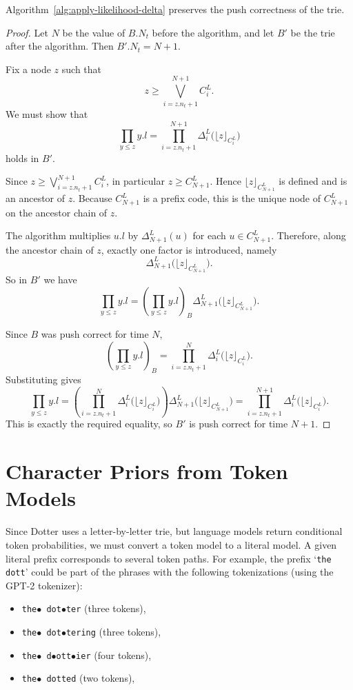 \begin{theorem}
    Algorithm~\ref{alg:apply-likelihood-delta} preserves the push correctness of the trie.
\end{theorem}
\begin{proof}
    Let $N$ be the value of $B.N_t$ before the algorithm, and let $B'$ be the trie after the algorithm.
    Then $B'.N_t = N+1$.

    Fix a node $z$ such that
    \[
    z \geq \bigvee_{i=z.n_t+1}^{N+1} C^L_i.
    \]
    We must show that
    \[
    \prod_{y \leq z} y.l
    =
    \prod_{i=z.n_t+1}^{N+1} \Delta^L_i\bigl(\lfloor z \rfloor_{C^L_i}\bigr)
    \]
    holds in $B'$.

    Since $z \geq \bigvee_{i=z.n_t+1}^{N+1} C^L_i$, in particular $z \geq C^L_{N+1}$.
    Hence $\lfloor z \rfloor_{C^L_{N+1}}$ is defined and is an ancestor of $z$.
    Because $C^L_{N+1}$ is a prefix code, this is the unique node of $C^L_{N+1}$
    on the ancestor chain of $z$.

    The algorithm multiplies $u.l$ by $\Delta^L_{N+1}(u)$ for each $u \in C^L_{N+1}$.
    Therefore, along the ancestor chain of $z$, exactly one factor is introduced, namely
    \[
    \Delta^L_{N+1}\bigl(\lfloor z \rfloor_{C^L_{N+1}}\bigr).
    \]
    So in $B'$ we have
    \[
    \prod_{y \leq z} y.l
    =
    \left(\prod_{y \leq z} y.l\right)_B
    \Delta^L_{N+1}\bigl(\lfloor z \rfloor_{C^L_{N+1}}\bigr).
    \]

    Since $B$ was push correct for time $N$,
    \[
    \left(\prod_{y \leq z} y.l\right)_B
    =
    \prod_{i=z.n_t+1}^{N} \Delta^L_i\bigl(\lfloor z \rfloor_{C^L_i}\bigr).
    \]
    Substituting gives
    \[
    \prod_{y \leq z} y.l
    =
    \left(\prod_{i=z.n_t+1}^{N} \Delta^L_i\bigl(\lfloor z \rfloor_{C^L_i}\bigr)\right)
    \Delta^L_{N+1}\bigl(\lfloor z \rfloor_{C^L_{N+1}}\bigr)
    =
    \prod_{i=z.n_t+1}^{N+1} \Delta^L_i\bigl(\lfloor z \rfloor_{C^L_i}\bigr).
    \]
    This is exactly the required equality, so $B'$ is push correct for time $N+1$.
\end{proof}



\section{Character Priors from Token Models}
\label{sec:character-priors-from-token-models}
Since Dotter uses a letter-by-letter trie, but language models return conditional token probabilities,
we must convert a token model to a literal model.  A given literal prefix corresponds to several token paths.
For example, the prefix `\texttt{the dott}' could be part of the phrases with the following
tokenizations (using the GPT-2 tokenizer):
\begin{itemize}
    \item \texttt{the$\bullet$ dot$\bullet$ter} (three tokens),
    \item \texttt{the$\bullet$ dot$\bullet$tering} (three tokens),
    \item \texttt{the$\bullet$ d$\bullet$ott$\bullet$ier} (four tokens),
    \item \texttt{the$\bullet$ dotted} (two tokens),
\end{itemize}

